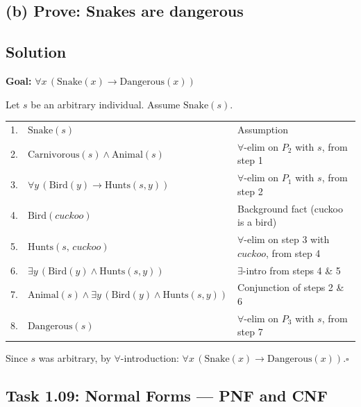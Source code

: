 \documentclass[11pt,a4paper]{article}
\newenvironment{solution}{%
    \begin{tcolorbox}[
        breakable,
        colback=green!4,
        colframe=green!50!black,
        fonttitle=\bfseries,
        title={ Solution},
        left=6pt, right=6pt, top=4pt, bottom=4pt
    ]%
    }{%
    \end{tcolorbox}%
}
\begin{document}
    \subsection*{(b) Prove: Snakes are dangerous}

    \subsection*{Solution}
    \begin{solution}
        \textbf{Goal:} $\forall x\,(\mathrm{Snake}(x) \to \mathrm{Dangerous}(x))$

        \medskip
        Let $s$ be an arbitrary individual. Assume $\mathrm{Snake}(s)$.

        \medskip
        \begin{tabular}{r l l}
            1. & $\mathrm{Snake}(s)$ & Assumption \\
            2. & $\mathrm{Carnivorous}(s) \land \mathrm{Animal}(s)$ & $\forall$-elim on $P_2$ with $s$, from step 1 \\
            3. & $\forall y\,(\mathrm{Bird}(y) \to \mathrm{Hunts}(s,y))$ & $\forall$-elim on $P_1$ with $s$, from step 2 \\
            4. & $\mathrm{Bird}(\mathit{cuckoo})$ & Background fact (cuckoo is a bird) \\
            5. & $\mathrm{Hunts}(s,\,\mathit{cuckoo})$ & $\forall$-elim on step 3 with $\mathit{cuckoo}$, from step 4 \\
            6. & $\exists y\,(\mathrm{Bird}(y) \land \mathrm{Hunts}(s,y))$ & $\exists$-intro from steps 4 \& 5 \\
            7. & $\mathrm{Animal}(s) \land \exists y\,(\mathrm{Bird}(y) \land \mathrm{Hunts}(s,y))$ & Conjunction of steps 2 \& 6 \\
            8. & $\mathrm{Dangerous}(s)$ & $\forall$-elim on $P_3$ with $s$, from step 7 \\
        \end{tabular}

        \medskip
        Since $s$ was arbitrary, by $\forall$-introduction: $\forall x\,(\mathrm{Snake}(x) \to \mathrm{Dangerous}(x))$.\hfill$\square$
    \end{solution}
    \subsection*{Task 1.09: Normal Forms — PNF and CNF}
\end{document}

